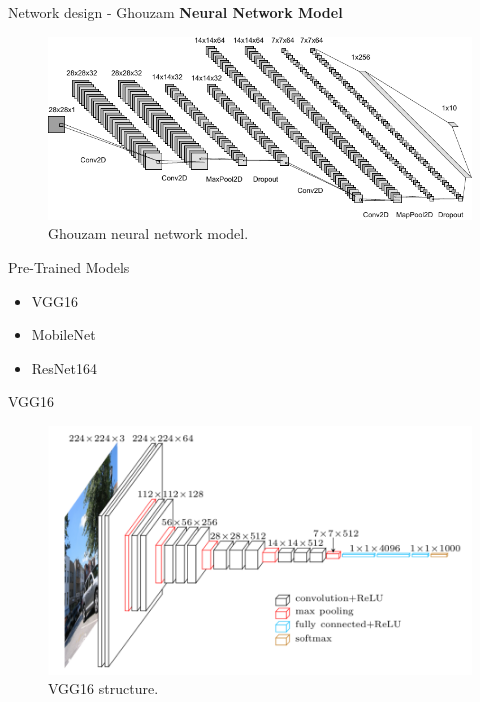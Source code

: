 \documentclass[12pt, dvipsnames]{beamer}
\begin{document}
\begin{frame}{Network design - Ghouzam}
    \textbf{Neural Network Model}
    \begin{figure}
        \centering
        \includegraphics[width=\textwidth]{resources/pdf/ghouzam.pdf}
        \caption{Ghouzam neural network model.}
    \end{figure}
\end{frame}

\begin{frame}{Pre-Trained Models}
    \begin{itemize}
        \item VGG16
        \item MobileNet
        \item ResNet164
    \end{itemize}
\end{frame}

\begin{frame}{VGG16}
    \begin{figure}
        \centering
        \includegraphics[scale=0.6]{resources/png/VGG16.png}
        \caption{VGG16 structure. \footnotemark}
        \label{fig:my_label}
    \end{figure}
\end{frame}
\end{document}
